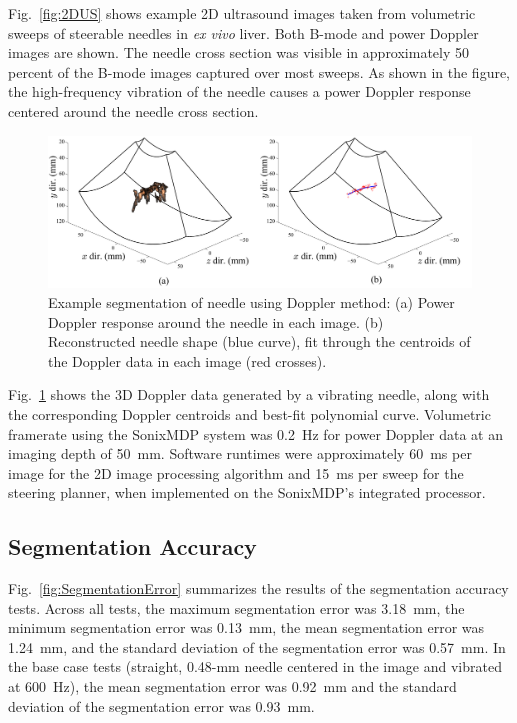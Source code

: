 \label{sec:Results}
Fig.~\ref{fig:2DUS} shows example 2D ultrasound images taken from volumetric sweeps of steerable needles in \textit{ex vivo} liver. Both B-mode and power Doppler images are shown. The needle cross section was visible in approximately 50 percent of the B-mode images captured over most sweeps. As shown in the figure, the high-frequency vibration of the needle causes a power Doppler response centered around the needle cross section.

\begin{figure}[!t]
\centering
\includegraphics[width=\textwidth]{Images/Chapter2/DopplerVisualization/Doppler3D}%
\caption[Example segmentation of needle using Doppler method]{Example segmentation of needle using Doppler method: (a) Power Doppler response around the needle in each image. (b) Reconstructed needle shape (blue curve), fit through the centroids of the Doppler data in each image (red crosses).}
\label{fig:SegmentationExample}
\end{figure}   

Fig.~\ref{fig:SegmentationExample} shows the 3D Doppler data generated by a vibrating needle, along with the corresponding Doppler centroids and best-fit polynomial curve. Volumetric framerate using the SonixMDP system was 0.2~Hz for power Doppler data at an imaging depth of 50~mm. Software runtimes were approximately 60~ms per image for the 2D image processing algorithm and 15~ms per sweep for the steering planner, when implemented on the SonixMDP's integrated processor.

\subsection{Segmentation Accuracy}
Fig.~\ref{fig:SegmentationError} summarizes the results of the segmentation accuracy tests. Across all tests, the maximum segmentation error was 3.18~mm, the minimum segmentation error was 0.13~mm, the mean segmentation error was 1.24~mm, and the standard deviation of the segmentation error was 0.57~mm. In the base case tests (straight, 0.48-mm needle centered in the image and vibrated at 600~Hz), the mean segmentation error was 0.92~mm and the standard deviation of the segmentation error was 0.93~mm.

